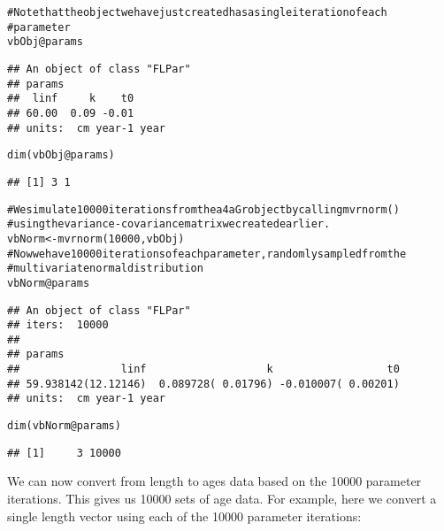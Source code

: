 \documentclass[a4paper,english,10pt]{article}\usepackage[]{graphicx}\usepackage[]{color}
\makeatletter
\newcommand{\hlnum}[1]{\textcolor[rgb]{0.063,0.58,0.627}{#1}}%
\newcommand{\hlcom}[1]{\textcolor[rgb]{0.588,0.588,0.588}{#1}}%
\newcommand{\hlopt}[1]{\textcolor[rgb]{0.196,0.196,0.196}{#1}}%
\newcommand{\hlstd}[1]{\textcolor[rgb]{0.196,0.196,0.196}{#1}}%
\newcommand{\hlkwb}[1]{\textcolor[rgb]{0.627,0,0.314}{#1}}%
\newcommand{\hlkwc}[1]{\textcolor[rgb]{0,0.631,0.314}{#1}}%
\newcommand{\hlkwd}[1]{\textcolor[rgb]{0.78,0.227,0.412}{#1}}%
\newenvironment{kframe}{%
 \def\at@end@of@kframe{}%
 \ifinner\ifhmode%
  \def\at@end@of@kframe{\end{minipage}}%
  \begin{minipage}{\columnwidth}%
 \fi\fi%
 \def\FrameCommand##1{\hskip\@totalleftmargin \hskip-\fboxsep
 \colorbox{shadecolor}{##1}\hskip-\fboxsep
     \hskip-\linewidth \hskip-\@totalleftmargin \hskip\columnwidth}%
 \MakeFramed {\advance\hsize-\width
   \@totalleftmargin\z@ \linewidth\hsize
   \@setminipage}}%
 {\par\unskip\endMakeFramed%
 \at@end@of@kframe}
\newenvironment{knitrout}{}{} %
\makeatother
\begin{document}
\begin{knitrout}
\color{fgcolor}\begin{kframe}
\begin{alltt}
\hlcom{# Note that the object we have just created has a single iteration of each}
\hlcom{# parameter}
\hlstd{vbObj}\hlopt{@}\hlkwc{params}
\end{alltt}
\begin{verbatim}
## An object of class "FLPar"
## params
##  linf     k    t0 
## 60.00  0.09 -0.01 
## units:  cm year-1 year
\end{verbatim}
\begin{alltt}
\hlkwd{dim}\hlstd{(vbObj}\hlopt{@}\hlkwc{params}\hlstd{)}
\end{alltt}
\begin{verbatim}
## [1] 3 1
\end{verbatim}
\begin{alltt}
\hlcom{# We simulate 10000 iterations from the a4aGr object by calling mvrnorm()}
\hlcom{# using the variance-covariance matrix we created earlier.}
\hlstd{vbNorm} \hlkwb{<-} \hlkwd{mvrnorm}\hlstd{(}\hlnum{10000}\hlstd{, vbObj)}
\hlcom{# Now we have 10000 iterations of each parameter, randomly sampled from the}
\hlcom{# multivariate normal distribution}
\hlstd{vbNorm}\hlopt{@}\hlkwc{params}
\end{alltt}
\begin{verbatim}
## An object of class "FLPar"
## iters:  10000 
## 
## params
##                linf                   k                  t0 
## 59.938142(12.12146)  0.089728( 0.01796) -0.010007( 0.00201) 
## units:  cm year-1 year
\end{verbatim}
\begin{alltt}
\hlkwd{dim}\hlstd{(vbNorm}\hlopt{@}\hlkwc{params}\hlstd{)}
\end{alltt}
\begin{verbatim}
## [1]     3 10000
\end{verbatim}
\end{kframe}
\end{knitrout}

We can now convert from length to ages data based on the 10000 parameter iterations. This gives us 10000 sets of age data. For example, here we convert a single length vector using each of the 10000 parameter iterations: 
\end{document}
